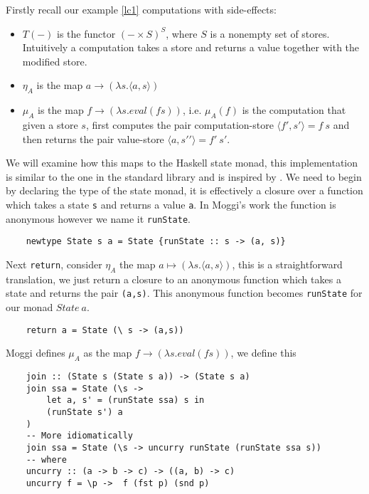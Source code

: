 Firstly recall our example \ref{lc1} computations with
side-effects\cite{moggi1989computational}:
\begin{itemize}
    \item $T(-)$ is the functor $(-\times S)^S$, where $S$ is a nonempty set of stores.
        Intuitively a computation takes a store and returns a value together with the modified store.
    \item $\eta_A$ is the map $a \rightarrow (\lambda s.\langle a,s \rangle)$
    \item $\mu_A$ is the map $f \rightarrow (\lambda s.eval(fs))$,
        i.e. $\mu_A(f)$ is the computation that given a store $s$,
        first computes the pair computation-store $\langle f\prime,s\prime\rangle = f\ s$
        and then returns the pair value-store $\langle a,s\prime\prime\rangle = f\prime\ s\prime$.
\end{itemize}

We will examine how this maps to the Haskell state monad,
this implementation is similar to the one in the standard library
and is inspired by \cite{jones1995functional}.
We need to begin by declaring the type of the state monad,
it is effectively a closure over a function
which takes a state \texttt{s} and returns a value \texttt{a}.
In Moggi's work the function is anonymous however we name it
\texttt{runState}.
\begin{verbatim}
    newtype State s a = State {runState :: s -> (a, s)}
\end{verbatim}

Next \texttt{return},
consider $\eta_A$ the map $a \mapsto (\lambda s.\langle a,s \rangle)$,
this is a straightforward translation,
we just return a closure to an anonymous function
which takes a state and returns the pair \texttt{(a,s)}.
This anonymous function becomes \texttt{runState} for our
monad $State\ a$.
\begin{verbatim}
    return a = State (\ s -> (a,s))
\end{verbatim}

Moggi defines $\mu_A$ as the map $f \rightarrow (\lambda s.eval(fs))$,
we define this
\begin{verbatim}
    join :: (State s (State s a)) -> (State s a)
    join ssa = State (\s ->
        let a, s' = (runState ssa) s in
        (runState s') a
    )
    -- More idiomatically
    join ssa = State (\s -> uncurry runState (runState ssa s))
    -- where
    uncurry :: (a -> b -> c) -> ((a, b) -> c)
    uncurry f = \p ->  f (fst p) (snd p)
\end{verbatim}

